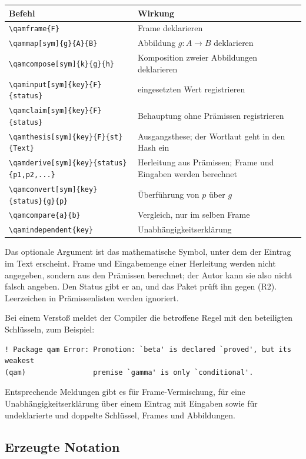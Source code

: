 \begin{center}
\small
\begin{tabular}{@{}p{}p{}@{}}
\toprule
Befehl & Wirkung\\
\midrule
\verb|\qamframe{F}| & Frame deklarieren\\
\verb|\qammap[sym]{g}{A}{B}| & Abbildung \(g\colon A\to B\) deklarieren\\
\verb|\qamcompose[sym]{k}{g}{h}| & Komposition zweier Abbildungen deklarieren\\
\verb|\qaminput[sym]{key}{F}{status}| & eingesetzten Wert registrieren\\
\verb|\qamclaim[sym]{key}{F}{status}| & Behauptung ohne Prämissen registrieren\\
\verb|\qamthesis[sym]{key}{F}{st}{Text}| & Ausgangsthese; der Wortlaut geht in den Hash ein\\
\verb|\qamderive[sym]{key}{status}{p1,p2,...}| & Herleitung aus Prämissen; Frame und Eingaben werden berechnet\\
\verb|\qamconvert[sym]{key}{status}{g}{p}| & Überführung von \(p\) über \(g\)\\
\verb|\qamcompare{a}{b}| & Vergleich, nur im selben Frame\\
\verb|\qamindependent{key}| & Unabhängigkeitserklärung\\
\bottomrule
\end{tabular}
\end{center}
Das optionale Argument ist das mathematische Symbol, unter dem der Eintrag im Text erscheint. Frame und Eingabemenge einer Herleitung
werden nicht angegeben, sondern aus den Prämissen berechnet; der Autor kann sie also nicht falsch angeben. Den Status gibt er an, und
das Paket prüft ihn gegen (R2). Leerzeichen in Prämissenlisten werden ignoriert.

Bei einem Verstoß meldet der Compiler die betroffene Regel mit den beteiligten Schlüsseln, zum Beispiel:
\begin{lstlisting}
! Package qam Error: Promotion: `beta' is declared `proved', but its weakest
(qam)                premise `gamma' is only `conditional'.
\end{lstlisting}
Entsprechende Meldungen gibt es für Frame-Vermischung, für eine Unabhängigkeitserklärung über einem Eintrag mit Eingaben sowie für
undeklarierte und doppelte Schlüssel, Frames und Abbildungen.

\subsection{Erzeugte Notation}

